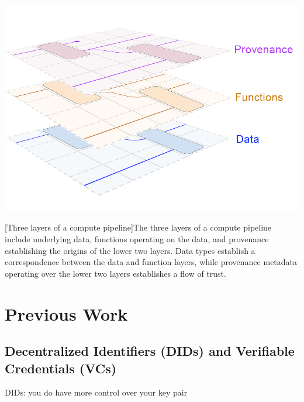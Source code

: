 \documentclass[9pt, oneside]{article}   	%
\begin{document}
\begin{multicols}{2}
\begin{center}
\includegraphics[width=1\columnwidth]{Fig1_20230626}
\begin{flushright}
[Three layers of a compute pipeline]{The three layers of a compute pipeline include underlying data, functions operating on the data, and provenance establishing the origins of the lower two layers. Data types establish a correspondence between the data and function layers, while provenance metadata operating over the lower two layers establishes a flow of trust.}
\label{layeredDataFig1}
\end{flushright}
\end{center}

\section{Previous Work}\label{PrevWork}

\subsection{Decentralized Identifiers (DIDs) and Verifiable Credentials (VCs)}\label{did-vc}

DIDs: you do have more control over your key pair


\end{multicols}
\end{document}
